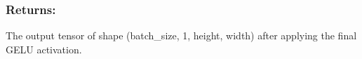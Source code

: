 \documentclass[a4paper,10pt,english]{sphinxmanual}
\begin{document}
\begin{fulllineitems}
\begin{fulllineitems}
\subsubsection{Returns:}
\label{\detokenize{models:id9}}\begin{description}
\sphinxAtStartPar
The output tensor of shape (batch\_size, 1, height, width)
after applying the final GELU activation.

\end{description}

\end{fulllineitems}


\end{fulllineitems}

\end{document}
